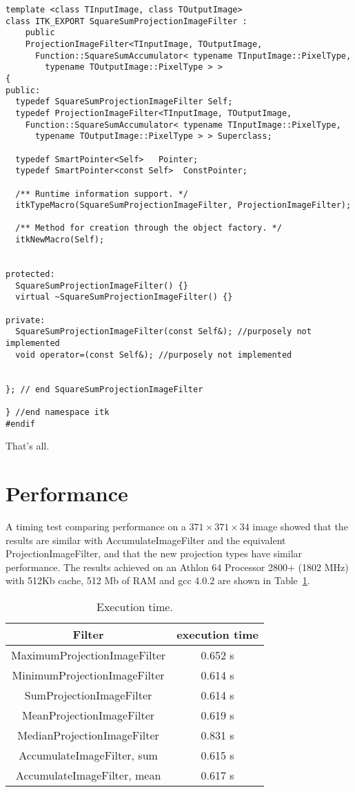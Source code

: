 \documentclass{InsightArticle}
\begin{document}
\small \begin{verbatim}
template <class TInputImage, class TOutputImage>
class ITK_EXPORT SquareSumProjectionImageFilter :
    public
    ProjectionImageFilter<TInputImage, TOutputImage,
      Function::SquareSumAccumulator< typename TInputImage::PixelType,
        typename TOutputImage::PixelType > >
{
public:
  typedef SquareSumProjectionImageFilter Self;
  typedef ProjectionImageFilter<TInputImage, TOutputImage, 
    Function::SquareSumAccumulator< typename TInputImage::PixelType,
      typename TOutputImage::PixelType > > Superclass;

  typedef SmartPointer<Self>   Pointer;
  typedef SmartPointer<const Self>  ConstPointer;

  /** Runtime information support. */
  itkTypeMacro(SquareSumProjectionImageFilter, ProjectionImageFilter);

  /** Method for creation through the object factory. */
  itkNewMacro(Self);


protected:
  SquareSumProjectionImageFilter() {}
  virtual ~SquareSumProjectionImageFilter() {}

private:
  SquareSumProjectionImageFilter(const Self&); //purposely not implemented
  void operator=(const Self&); //purposely not implemented


}; // end SquareSumProjectionImageFilter

} //end namespace itk
#endif
\end{verbatim} \normalsize
That's all.

\section{Performance}

A timing test comparing performance on a $371 \times 371 \times 34$
image showed that the results are similar with AccumulateImageFilter
and the equivalent ProjectionImageFilter, and that the new projection
types have similar performance. The results achieved on an Athlon 64 
Processor 2800+ (1802 MHz) with 512Kb cache, 512 Mb of RAM and gcc
4.0.2 are shown in Table~\ref{perf}.

\begin{table}[htbp]
\centering
\begin{tabular}{cc}
\hline
Filter & execution time \\
\hline
\hline
MaximumProjectionImageFilter & 0.652 s \\
MinimumProjectionImageFilter  & 0.614 s\\
SumProjectionImageFilter  & 0.614 s\\
MeanProjectionImageFilter  & 0.619 s\\
MedianProjectionImageFilter  & 0.831 s\\
AccumulateImageFilter, sum  & 0.615 s\\
AccumulateImageFilter, mean  & 0.617 s\\
\hline
\end{tabular}
\caption{Execution time.\label{perf}}
\end{table}
\end{document}
